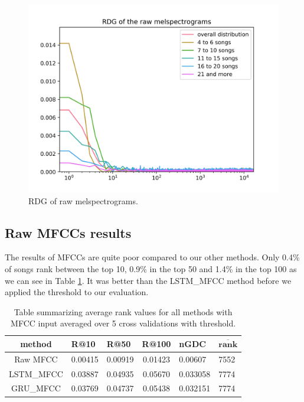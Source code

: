 \begin{figure}[h]
    \centering
	\includegraphics[width=120mm]{./img/raw_mel_graph.png}
	\caption{RDG of raw melspectrograms.}
	\label{fig:raw_mel_graph}
\end{figure}

\subsection{Raw MFCCs results}\label{ssec:raw_mfccs_results}

The results of MFCCs are quite poor compared to our other methods. Only 0.4\% of songs rank between the top 10, 0.9\% in the top 50 and 1.4\% in the top 100 as we can see in Table \ref{table:mfcc_methods}. It was better than the LSTM\_MFCC method before we applied the threshold to our evaluation.
\begin{table}[h]
\centering
\renewcommand{\arraystretch}{1.5}
\begin{tabu} to 1\textwidth { | c || X[c] | X[c] | c | X[c] | X[c] |}
 \hline
 \textbf{method} & \textbf{R@10} & \textbf{R@50} & \textbf{R@100} & \textbf{nGDC} & $ \boldsymbol{\overline{rank}} $ \\
 \hline
 \hline
 Raw MFCC & 0.00415 & 0.00919 & 0.01423 & 0.00607 &  7552 \\
 \hline
 LSTM\_MFCC & 0.03887 & 0.04935 & 0.05670 & 0.033058 & 7774 \\
 \hline
 GRU\_MFCC & 0.03769 & 0.04737 & 0.05438 & 0.032151 & 7774 \\
 \hline
\end{tabu} \\

\caption{Table summarizing average rank values for all methods with MFCC input averaged over 5 cross validations with threshold.}
\label{table:mfcc_methods}
\end{table}

